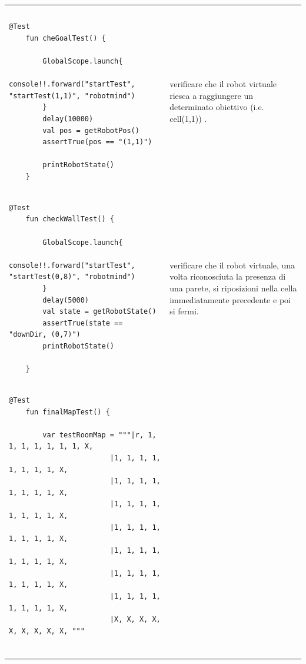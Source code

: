 \begin{center}
    

\begin{tabular}{|@{}p{10cm}|p{5cm}|}
\hline\\
  &   \\
\begin{lstlisting}[backgroundcolor=\color{white}]
    @Test
	fun cheGoalTest() {
		
		GlobalScope.launch{
 			console!!.forward("startTest", "startTest(1,1)", "robotmind")
 		}
		delay(10000)
		val pos = getRobotPos()
		assertTrue(pos == "(1,1)")
		
		printRobotState()
	}
\end{lstlisting} &  \vspace{0.5ex}  verificare che il robot virtuale riesca a raggiungere un determinato obiettivo (i.e. cell(1,1)) . \\
\hline 


\begin{lstlisting}[backgroundcolor=\color{white}]
    @Test
	fun checkWallTest() {
		
		GlobalScope.launch{
 			console!!.forward("startTest", "startTest(0,8)", "robotmind")
 		}
		delay(5000)
		val state = getRobotState()
		assertTrue(state == "downDir, (0,7)")
		printRobotState()
		
	}
\end{lstlisting} &  \vspace{0.5ex}  verificare che il robot virtuale, una volta riconosciuta la presenza di una parete, si riposizioni nella cella immediatamente precedente e poi si fermi. \\
\hline 

\begin{lstlisting}[backgroundcolor=\color{white}]
	@Test
	fun finalMapTest() {
		
		var testRoomMap = """|r, 1, 1, 1, 1, 1, 1, 1, X,  
                        |1, 1, 1, 1, 1, 1, 1, 1, X, 
                        |1, 1, 1, 1, 1, 1, 1, 1, X, 
                        |1, 1, 1, 1, 1, 1, 1, 1, X, 
                        |1, 1, 1, 1, 1, 1, 1, 1, X, 
                        |1, 1, 1, 1, 1, 1, 1, 1, X, 
                        |1, 1, 1, 1, 1, 1, 1, 1, X, 
                        |1, 1, 1, 1, 1, 1, 1, 1, X, 
                        |X, X, X, X, X, X, X, X, X, """
          

\end{lstlisting}
\end{tabular}
\end{center}
